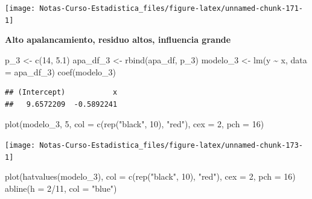 \documentclass[
  12pt,
]{book}
\newenvironment{Shaded}{\begin{snugshade}}{\end{snugshade}}
\newcommand{\AttributeTok}[1]{\textcolor[rgb]{0.77,0.63,0.00}{#1}}
\newcommand{\DecValTok}[1]{\textcolor[rgb]{0.00,0.00,0.81}{#1}}
\newcommand{\FloatTok}[1]{\textcolor[rgb]{0.00,0.00,0.81}{#1}}
\newcommand{\FunctionTok}[1]{\textcolor[rgb]{0.00,0.00,0.00}{#1}}
\newcommand{\NormalTok}[1]{#1}
\newcommand{\OtherTok}[1]{\textcolor[rgb]{0.56,0.35,0.01}{#1}}
\newcommand{\SpecialCharTok}[1]{\textcolor[rgb]{0.00,0.00,0.00}{#1}}
\newcommand{\StringTok}[1]{\textcolor[rgb]{0.31,0.60,0.02}{#1}}
\begin{document}
\begin{center}\texttt{[image: Notas-Curso-Estadistica\_files/figure-latex/unnamed-chunk-171-1]} \end{center}

\textbf{Alto apalancamiento, residuo altos, influencia grande}

\begin{Shaded}
\begin{Highlighting}[]
\NormalTok{p\_3 }\OtherTok{\textless{}{-}} \FunctionTok{c}\NormalTok{(}\DecValTok{14}\NormalTok{, }\FloatTok{5.1}\NormalTok{)}
\NormalTok{apa\_df\_3 }\OtherTok{\textless{}{-}} \FunctionTok{rbind}\NormalTok{(apa\_df, p\_3)}
\NormalTok{modelo\_3 }\OtherTok{\textless{}{-}} \FunctionTok{lm}\NormalTok{(y }\SpecialCharTok{\textasciitilde{}}\NormalTok{ x, }\AttributeTok{data =}\NormalTok{ apa\_df\_3)}
\FunctionTok{coef}\NormalTok{(modelo\_3)}
\end{Highlighting}
\end{Shaded}

\begin{verbatim}
## (Intercept)           x 
##   9.6572209  -0.5892241
\end{verbatim}

\begin{Shaded}
\begin{Highlighting}[]
\FunctionTok{plot}\NormalTok{(modelo\_3, }\DecValTok{5}\NormalTok{, }\AttributeTok{col =} \FunctionTok{c}\NormalTok{(}\FunctionTok{rep}\NormalTok{(}\StringTok{"black"}\NormalTok{, }\DecValTok{10}\NormalTok{), }\StringTok{"red"}\NormalTok{),}
    \AttributeTok{cex =} \DecValTok{2}\NormalTok{, }\AttributeTok{pch =} \DecValTok{16}\NormalTok{)}
\end{Highlighting}
\end{Shaded}

\begin{center}\texttt{[image: Notas-Curso-Estadistica\_files/figure-latex/unnamed-chunk-173-1]} \end{center}

\begin{Shaded}
\begin{Highlighting}[]
\FunctionTok{plot}\NormalTok{(}\FunctionTok{hatvalues}\NormalTok{(modelo\_3), }\AttributeTok{col =} \FunctionTok{c}\NormalTok{(}\FunctionTok{rep}\NormalTok{(}\StringTok{"black"}\NormalTok{, }\DecValTok{10}\NormalTok{),}
    \StringTok{"red"}\NormalTok{), }\AttributeTok{cex =} \DecValTok{2}\NormalTok{, }\AttributeTok{pch =} \DecValTok{16}\NormalTok{)}
\FunctionTok{abline}\NormalTok{(}\AttributeTok{h =} \DecValTok{2}\SpecialCharTok{/}\DecValTok{11}\NormalTok{, }\AttributeTok{col =} \StringTok{"blue"}\NormalTok{)}
\end{Highlighting}
\end{Shaded}
\end{document}
